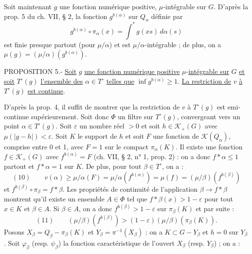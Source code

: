 Soit maintenant $g$ une fonction numérique positive, $\mu$-intégrable sur $G$. D'après la prop. 5 du ch. VII, § 2, la fonction $g^{b(\alpha)}$ sur $Q_\alpha$ définie par
\[
g^{b(\alpha)}\circ\pi_\alpha(x)=\int^*g(xs)\,d\alpha(s)
\]
est finie presque partout (pour $\mu/\alpha$) et est $\mu/\alpha$-intégrable ; de plus, on a $\mu(g)=(\mu/\alpha)(g^{b(\alpha)})$.

PROPOSITION 5.- \uline{Soit} $g$ \uline{une fonction numérique positive} $\mu$-\uline{intégrable sur} $G$ \uline{et soit} $T^\circ(g)$ \uline{l'ensemble des} $\alpha\in T^\circ$ \uline{telles que} $\inf g^{b(\alpha)}\geq 1$. \uline{La restriction de} $v$ \uline{à} $T^\circ(g)$ \uline{est continue}.

D'après la prop. 4, il suffit de montrer que la restriction de $v$ à $T^\circ(g)$ est emi-continue supérieurement. Soit donc $\Phi$ un filtre sur $T^\circ(g)$, convergeant vers un point $\alpha\in T^\circ(g)$. Soit $\varepsilon$ un nombre réel $>0$ et soit $h\in\mathcal K_+(G)$ avec $\mu(|g-h|)<\varepsilon$. Soit $K$ le support de $h$ et soit $F$ une fonction de $\mathcal K(Q_\alpha)$, comprise entre 0 et 1, avec $F=1$ sur le compact $\pi_\alpha(K)$. Il existe une fonction $f\in\mathcal K_+(G)$ avec $f^{b(\alpha)}=F$ (ch. VII, § 2, n° 1, prop. 2) : on a donc $f*\alpha\leq 1$ partout et $f*\alpha=1$ sur $K$. De plus, pour tout $\beta\in T^\circ$, on a :
\[
(10)\qquad v(\alpha)\geq\mu/\alpha(F)=\mu/\alpha(f^{b(\alpha)})=\mu(f)=(\mu/\beta)(f^{b(\beta)})
\]
et $f^{b(\beta)}\circ\pi_\beta=f*\beta$. Les propriétés de continuité de l'application $\beta\longrightarrow f*\beta$ montrent qu'il existe un ensemble $A\in\Phi$ tel que $f*\beta(x)>1-\varepsilon$ pour tout $x\in K$ et $\beta\in A$. Si $\beta\in A$, on a donc $f^{b(\beta)}>1-\varepsilon$ sur $\pi_\beta(K)$ et par suite :
\[
(11)\qquad (\mu/\beta)(f^{b(\beta)})>(1-\varepsilon)(\mu/\beta)(\pi_\beta(K)).
\]
Posons $X_\beta=Q_\beta-\pi_\beta(K)$ et $Y_\beta=\pi^{-1}(X_\beta)$ : on a $K\subset G-Y_\beta$ et $h=0$ sur $Y_\beta$.
Soit $\varphi_\beta$ (resp. $\psi_\beta$) la fonction caractéristique de l'ouvert $X_\beta$ (resp. $Y_\beta$) ; on a :

